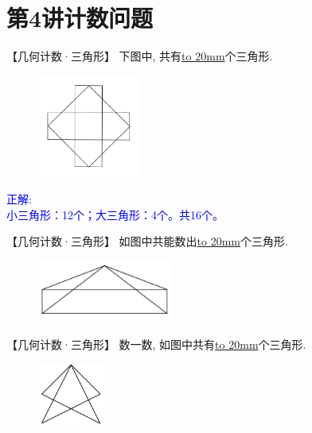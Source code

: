 \section{第4讲\quad 计数问题}

\item {
    【几何计数·三角形】
    下图中, 共有\underline{\hbox to 20mm{}}个三角形.
    \begin{figure}[H] 
        \centering
        \includegraphics[width=0.3\textwidth]{./pics/Chapter_4/12.png}
    \end{figure}
    \ifshowSolution 
        \fangsong{}\textcolor{blue}{
            正解: \\
            小三角形：12个；大三角形：4个。共16个。
        }
    \else
        \vspace{1cm}
    \fi
}

\item {
    【几何计数·三角形】
    如图中共能数出\underline{\hbox to 20mm{}}个三角形.
    \begin{figure}[H] 
        \centering
        \includegraphics[width=0.4\textwidth]{./pics/Chapter_4/2015_1.png}
    \end{figure}
}

\item {
    【几何计数·三角形】
    数一数, 如图中共有\underline{\hbox to 20mm{}}个三角形.
    \begin{figure}[H] 
        \centering
        \includegraphics[width=0.2\textwidth]{./pics/Chapter_4/2015_2.png}
    \end{figure}
}

